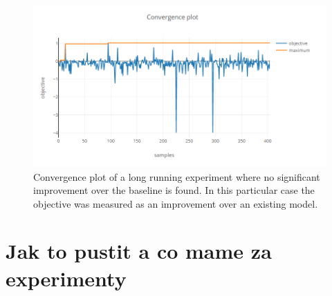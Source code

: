 \begin{figure}
	\begin{center}
		\includegraphics[width=1.0\textwidth]{images/convergence-plot-long-exp.png}
		\caption{Convergence plot of a long running experiment where no significant improvement over the baseline is found. In this particular case the objective was measured as an improvement over an existing model.}
	\end{center}
\end{figure}
\label{figure:convergence-plot-long-exp}


\section{Jak to pustit a co mame za experimenty}



